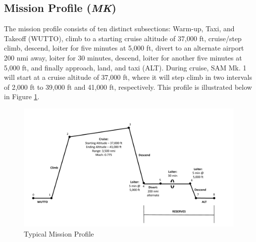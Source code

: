 \subsection{Mission Profile (\textit{MK})}
The mission profile consists of ten distinct subsections: Warm-up, Taxi, and Takeoff (WUTTO), climb to a starting cruise altitude of 37,000 ft, cruise/step climb, descend, loiter for five minutes at 5,000 ft, divert to an alternate airport 200 nmi away, loiter for 30 minutes, descend, loiter for another five minutes at 5,000 ft, and finally approach, land, and taxi (ALT). During cruise, SAM Mk. 1 will start at a cruise altitude of 37,000 ft, where it will step climb in two intervals of 2,000 ft to 39,000 ft and 41,000 ft, respectively. This profile is illustrated below in Figure \ref{fig:missionprof}. 

\begin{figure}[!h]
    \centering
    \includegraphics[width=1.0\textwidth]{Photos/Mission_Profile_(3-9-20).pdf}
    \caption{Typical Mission Profile}
    \label{fig:missionprof}
 \end{figure}

